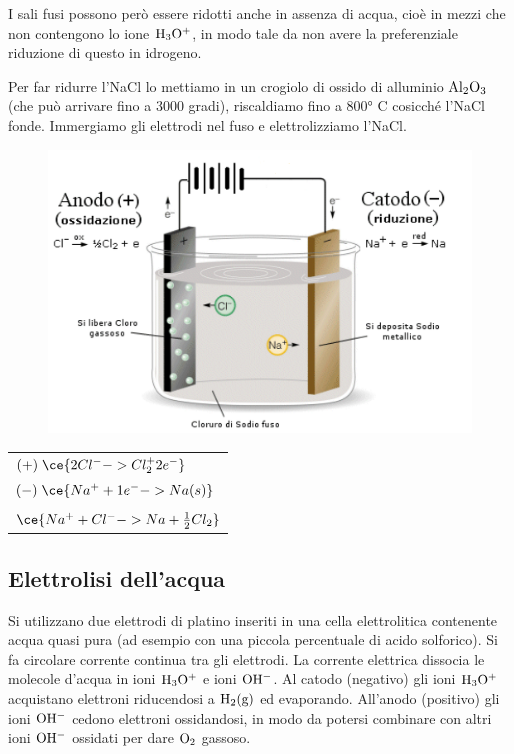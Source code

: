 I sali fusi possono però essere ridotti anche in assenza di acqua, cioè in mezzi che non contengono lo ione $\rm H_3O^+$, in modo tale da non avere la preferenziale riduzione di questo in idrogeno.

Per far ridurre l'NaCl lo mettiamo in un crogiolo di ossido di alluminio $\rm Al_2O_3$ (che può arrivare fino a 3000 gradi), riscaldiamo fino a 800° C cosicché l'NaCl fonde. Immergiamo gli elettrodi nel fuso e elettrolizziamo l'NaCl.

\begin{figure}[H]
    \centering
    \includegraphics[width=12cm]{immagini/elettrolisi_sali_fusi.png}
\end{figure}

\begin{center}
    \begin{tabular}{p{4.8cm}}
        $(+) \; \ce{2Cl^- -> Cl_2 ^ +2e^-}$\\[0.2cm]
        $(-) \; \ce{Na^+ + 1e^- -> Na(s)}$\\[0.2cm]
        \hline
        \\
        \vspace{-0.6cm}$\ce{Na^+ + Cl^- -> Na + \frac{1}{2}Cl_2}$
    \end{tabular}
\end{center}


\subsection{Elettrolisi dell'acqua}

Si utilizzano due elettrodi di platino inseriti in una cella elettrolitica contenente acqua quasi pura (ad esempio con una piccola percentuale di acido solforico). Si fa circolare corrente continua tra gli elettrodi. La corrente elettrica dissocia le molecole d'acqua in ioni $\rm H_3O^+$ e ioni $\rm OH^-$. Al catodo (negativo) gli ioni $\rm H_3O^+$ acquistano elettroni riducendosi a $\rm H_2(g)$ ed evaporando. All'anodo (positivo) gli ioni $\rm OH^-$ cedono elettroni ossidandosi, in modo da potersi combinare con altri ioni $\rm OH^-$ ossidati per dare $\rm O_2$ gassoso.

